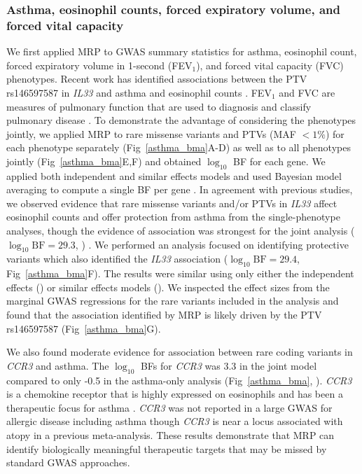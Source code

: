 \subsubsection*{Asthma, eosinophil counts, forced expiratory volume, and forced vital capacity}
We first applied MRP to GWAS summary statistics for asthma, eosinophil count, forced expiratory volume in 1-second (FEV$_1$), and forced vital capacity (FVC) phenotypes. Recent work has identified associations between the PTV rs146597587 in \textit{IL33} and asthma and eosinophil counts \cite{DeBoever179762, 10.1371/journal.pgen.1006659}. FEV$_1$ and FVC are measures of pulmonary function that are used to diagnosis and classify pulmonary disease \cite{Swanney1046}. To demonstrate the advantage of considering the phenotypes jointly, we applied MRP to rare missense variants and PTVs (MAF $< 1\%$) for each phenotype separately (Fig~\ref{asthma_bma}A-D) as well as to all phenotypes jointly (Fig~\ref{asthma_bma}E,F) and obtained $\log_{10}$ BF for each gene. We applied both independent and similar effects models and used Bayesian model averaging to compute a single BF per gene \cite{10.2307/2676803}. In agreement with previous studies, we observed evidence that rare missense variants and/or PTVs in \textit{IL33} affect eosinophil counts and offer protection from asthma from the single-phenotype analyses, though the evidence of association was strongest for the joint analysis ($\log_{10} \textrm{BF} = 29.3$, ) \cite{DeBoever179762, 10.1371/journal.pgen.1006659}. We performed an analysis focused on identifying protective variants which also identified the \textit{IL33} association ($\log_{10} \textrm{BF} = 29.4$, Fig~\ref{asthma_bma}F). The results were similar using only either the independent effects () or similar effects models (). We inspected the effect sizes from the marginal GWAS regressions for the rare variants included in the analysis and found that the association identified by MRP is likely driven by the PTV rs146597587 (Fig~\ref{asthma_bma}G).

We also found moderate evidence for association between rare coding variants in \textit{CCR3} and asthma. The $\log_{10}$ BFs for \textit{CCR3} was 3.3 in the joint model compared to only -0.5 in the asthma-only analysis  (Fig~\ref{asthma_bma}, ). \textit{CCR3} is a chemokine receptor that is highly expressed on eosinophils and has been a therapeutic focus for asthma \cite{Neighbour:2014jw, Pease:2014em}. \textit{CCR3} was not reported in a large GWAS for allergic disease including asthma\cite{Ferreira:2017ba} though \textit{CCR3} is near a locus associated with atopy in a previous meta-analysis\cite{Ober:2011jk}. These results demonstrate that MRP can identify biologically meaningful therapeutic targets that may be missed by standard GWAS approaches.

